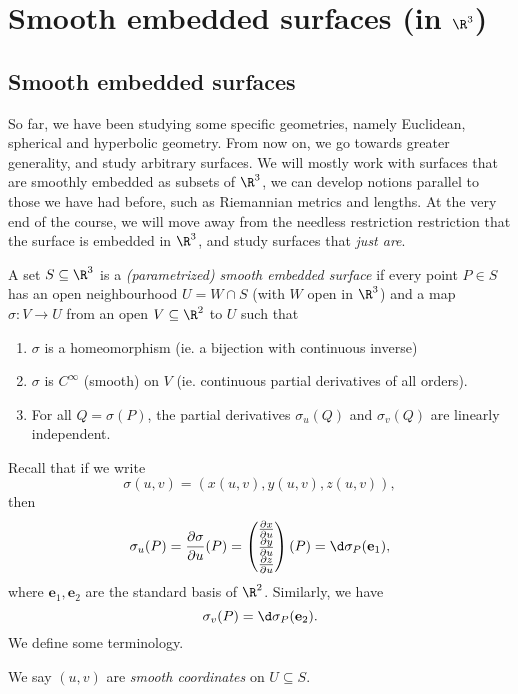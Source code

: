\documentclass[a4paper]{article}
\begin{document}
\section{Smooth embedded surfaces (in \texorpdfstring{$\R^3$}{R3})}
\subsection{Smooth embedded surfaces}
So far, we have been studying some specific geometries, namely Euclidean, spherical and hyperbolic geometry. From now on, we go towards greater generality, and study arbitrary surfaces. We will mostly work with surfaces that are smoothly embedded as subsets of $\R^3$, we can develop notions parallel to those we have had before, such as Riemannian metrics and lengths. At the very end of the course, we will move away from the needless restriction restriction that the surface is embedded in $\R^3$, and study surfaces that \emph{just are}.

\begin{defi}
  A set $S \subseteq \R^3$ is a \emph{(parametrized) smooth embedded surface} if every point $P \in S$ has an open neighbourhood $U = W \cap S$ (with $W$ open in $\R^3$) and a map $\sigma: V \to U$ from an open $V \subseteq \R^2$ to $U$ such that
  \begin{enumerate}
    \item $\sigma$ is a homeomorphism (ie. a bijection with continuous inverse)
    \item $\sigma$ is $C^\infty$ (smooth) on $V$ (ie. continuous partial derivatives of all orders).
    \item For all $Q = \sigma(P)$, the partial derivatives $\sigma_u(Q)$ and $\sigma_v(Q)$ are linearly independent.
  \end{enumerate}
\end{defi}
Recall that if we write
\[
  \sigma(u, v) = (x(u, v), y(u, v), z(u, v)),
\]
then
\[
  \sigma_u(P) = \frac{\partial \sigma}{\partial u}(P) =
  \begin{pmatrix}
    \frac{\partial x}{\partial u}\\
    \frac{\partial y}{\partial u}\\
    \frac{\partial z}{\partial u}
  \end{pmatrix}
  (P)
  = \d\sigma_P (\mathbf{e}_1),
\]
where $\mathbf{e}_1, \mathbf{e}_2$ are the standard basis of $\R^2$. Similarly, we have
\[
  \sigma_v(P) = \d \sigma_P(\mathbf{e}_2).
\]
We define some terminology.
\begin{defi}
  We say $(u, v)$ are \emph{smooth coordinates} on $U \subseteq S$.
\end{defi}
\end{document}
